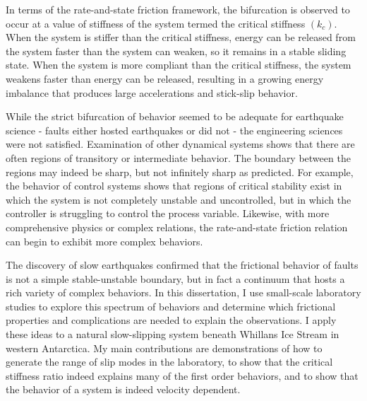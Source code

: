 In terms of the rate-and-state friction framework, the bifurcation is observed to occur at a value of stiffness of the system termed the critical stiffness $(k_c)$. When the system is stiffer than the critical stiffness, energy can be released from the system faster than the system can weaken, so it remains in a stable sliding state. When the system is more compliant than the critical stiffness, the system weakens faster than energy can be released, resulting in a growing energy imbalance that produces large accelerations and stick-slip behavior.  

While the strict bifurcation of behavior seemed to be adequate for earthquake science - faults either hosted earthquakes or did not - the engineering sciences were not satisfied. Examination of other dynamical systems shows that there are often regions of transitory or intermediate behavior. The boundary between the regions may indeed be sharp, but not infinitely sharp as predicted. For example, the behavior of control systems shows that regions of critical stability exist in which the system is not completely unstable and uncontrolled, but in which the controller is struggling to control the process variable. Likewise, with more comprehensive physics or complex relations, the rate-and-state friction relation can begin to exhibit more complex behaviors. 

The discovery of slow earthquakes confirmed that the frictional behavior of faults is not a simple stable-unstable boundary, but in fact a continuum that hosts a rich variety of complex behaviors. In this dissertation, I use small-scale laboratory studies to explore this spectrum of behaviors and determine which frictional properties and complications are needed to explain the observations. I apply these ideas to a natural slow-slipping system beneath Whillans Ice Stream in western Antarctica. My main contributions are demonstrations of how to generate the range of slip modes in the laboratory, to show that the critical stiffness ratio indeed explains many of the first order behaviors, and to show that the behavior of a system is indeed velocity dependent.
